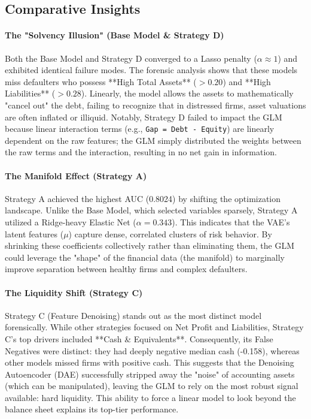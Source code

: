 \documentclass{report}\usepackage[]{graphicx}\usepackage[]{xcolor}
\begin{document}
\subsection{Comparative Insights}

\paragraph{The "Solvency Illusion" (Base Model \& Strategy D)}
Both the Base Model and Strategy D converged to a Lasso penalty ($\alpha \approx 1$) and exhibited identical failure modes. The forensic analysis shows that these models miss defaulters who possess **High Total Assets** ($>0.20$) and **High Liabilities** ($>0.28$). Linearly, the model allows the assets to mathematically "cancel out" the debt, failing to recognize that in distressed firms, asset valuations are often inflated or illiquid. Notably, Strategy D failed to impact the GLM because linear interaction terms (e.g., \texttt{Gap = Debt - Equity}) are linearly dependent on the raw features; the GLM simply distributed the weights between the raw terms and the interaction, resulting in no net gain in information.

\paragraph{The Manifold Effect (Strategy A)}
Strategy A achieved the highest AUC (0.8024) by shifting the optimization landscape. Unlike the Base Model, which selected variables sparsely, Strategy A utilized a Ridge-heavy Elastic Net ($\alpha=0.343$). This indicates that the VAE's latent features ($\mu$) capture dense, correlated clusters of risk behavior. By shrinking these coefficients collectively rather than eliminating them, the GLM could leverage the "shape" of the financial data (the manifold) to marginally improve separation between healthy firms and complex defaulters.

\paragraph{The Liquidity Shift (Strategy C)}
Strategy C (Feature Denoising) stands out as the most distinct model forensically. While other strategies focused on Net Profit and Liabilities, Strategy C's top drivers included **Cash \& Equivalents**. Consequently, its False Negatives were distinct: they had deeply negative median cash (-0.158), whereas other models missed firms with positive cash. This suggests that the Denoising Autoencoder (DAE) successfully stripped away the "noise" of accounting assets (which can be manipulated), leaving the GLM to rely on the most robust signal available: hard liquidity. This ability to force a linear model to look beyond the balance sheet explains its top-tier performance.
\end{document}
